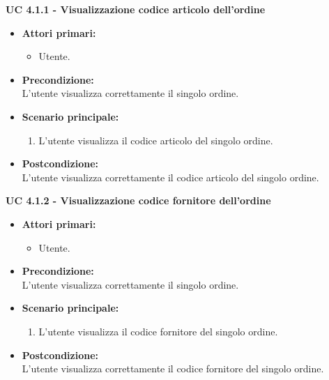 \noindent \textbf{\large UC 4.1.1 - Visualizzazione codice articolo dell'ordine}
\label{uc:visualizzazione-codice-articolo}
\begin{itemize}

	\item \textbf{Attori primari: }
		\begin{itemize}
			\item Utente.
		\end{itemize}

	\item \textbf{Precondizione: }\\[0.3cm]
		L'utente visualizza correttamente il singolo ordine.

	\item \textbf{Scenario principale: }
		\begin{enumerate}
			\item L'utente visualizza il codice articolo del singolo ordine.
		\end{enumerate}
		

	\item \textbf{Postcondizione: }\\[0.3cm]
		L'utente visualizza correttamente il codice articolo del singolo ordine.

\end{itemize}

\vspace{0.5cm}

\noindent \textbf{\large UC 4.1.2 - Visualizzazione codice fornitore dell'ordine}
\label{uc:visualizzazione-codice-fornitore}
\begin{itemize}

	\item \textbf{Attori primari: }
		\begin{itemize}
			\item Utente.
		\end{itemize}

	\item \textbf{Precondizione: }\\[0.3cm]
		L'utente visualizza correttamente il singolo ordine.

	\item \textbf{Scenario principale: }
		\begin{enumerate}
			\item L'utente visualizza il codice fornitore del singolo ordine.
		\end{enumerate}
		

	\item \textbf{Postcondizione: }\\[0.3cm]
		L'utente visualizza correttamente il codice fornitore del singolo ordine.

\end{itemize}

